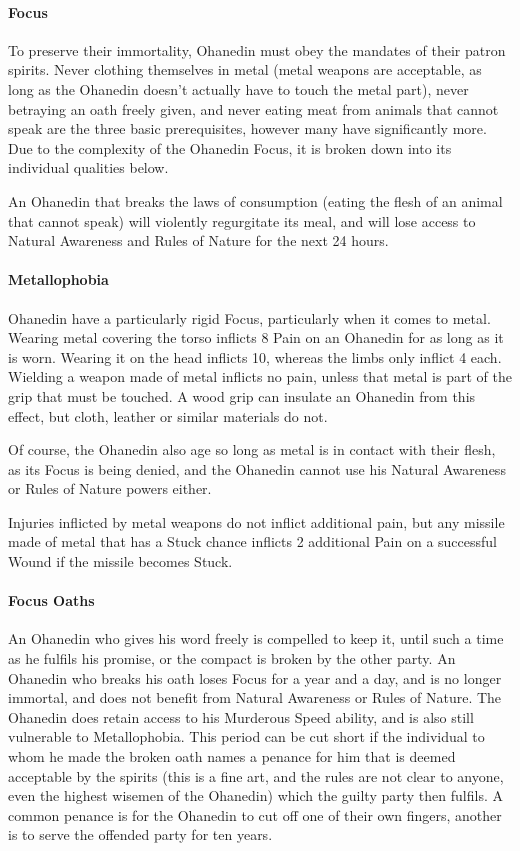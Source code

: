 \documentclass[oneside,11pt,english]{book}
\begin{document}
\paragraph{Focus}
To preserve their immortality, Ohanedin must obey the mandates of their patron spirits. Never clothing themselves in metal (metal weapons are acceptable, as long as the Ohanedin doesn't actually have to touch the metal part), never betraying an oath freely given, and never eating meat from animals that cannot speak are the three basic prerequisites, however many have significantly more. Due to the complexity of the Ohanedin Focus, it is broken down into its individual qualities below. 


An Ohanedin that breaks the laws of consumption (eating the flesh of an animal that cannot speak) will violently regurgitate its meal, and will lose access to Natural Awareness and Rules of Nature for the next 24 hours.
\paragraph{Metallophobia}
Ohanedin have a particularly rigid Focus, particularly when it comes to metal. Wearing metal 
covering the torso inflicts 8 Pain on an Ohanedin for as long as it is worn. Wearing it on the head 
inflicts 10, whereas the limbs only inflict 4 each. Wielding a weapon made of metal inflicts no 
pain, unless that metal is part of the grip that must be touched. A wood grip can insulate an 
Ohanedin from this effect, but cloth, leather or similar materials do not. 


Of course, the Ohanedin also age so long as metal is in contact with their flesh, as its Focus is 
being denied, and the Ohanedin cannot use his Natural Awareness or Rules of Nature powers 
either.


Injuries inflicted by metal weapons do not inflict additional pain, but any missile made of metal that has a Stuck chance inflicts 2 additional Pain on a successful Wound if the missile becomes Stuck. 
\paragraph{Focus Oaths}
An Ohanedin who gives his word freely is compelled to keep it, until such a time as he fulfils his 
promise, or the compact is broken by the other party. An Ohanedin who breaks his oath loses 
Focus for a year and a day, and is no longer immortal, and does not benefit from Natural 
Awareness or Rules of Nature. The Ohanedin does retain access to his Murderous Speed ability, 
and is also still vulnerable to Metallophobia. This period can be cut short if the individual to 
whom he made the broken oath names a penance for him that is deemed acceptable by the spirits 
(this is a fine art, and the rules are not clear to anyone, even the highest wisemen of the 
Ohanedin) which the guilty party then fulfils. A common penance is for the Ohanedin to cut off 
one of their own fingers, another is to serve the offended party for ten years. 
\end{document}
